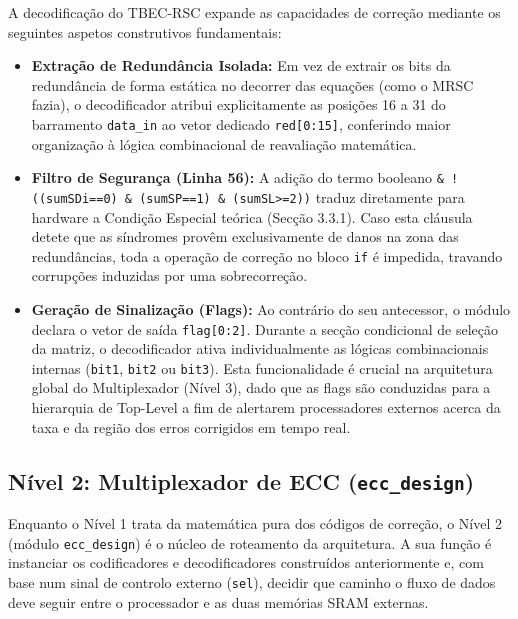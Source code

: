 \documentclass[12pt,a4paper]{article}
\begin{document}
A decodificação do TBEC-RSC expande as capacidades de correção mediante os seguintes aspetos construtivos fundamentais:
\begin{itemize}
    \item \textbf{Extração de Redundância Isolada:} Em vez de extrair os bits da redundância de forma estática no decorrer das equações (como o MRSC fazia), o decodificador atribui explicitamente as posições 16 a 31 do barramento \texttt{data\_in} ao vetor dedicado \texttt{red[0:15]}, conferindo maior organização à lógica combinacional de reavaliação matemática.
    \item \textbf{Filtro de Segurança (Linha 56):} A adição do termo booleano \texttt{\& !((sumSDi==0) \& (sumSP==1) \& (sumSL>=2))} traduz diretamente para hardware a Condição Especial teórica (Secção 3.3.1). Caso esta cláusula detete que as síndromes provêm exclusivamente de danos na zona das redundâncias, toda a operação de correção no bloco \texttt{if} é impedida, travando corrupções induzidas por uma sobrecorreção.
    \item \textbf{Geração de Sinalização (Flags):} Ao contrário do seu antecessor, o módulo declara o vetor de saída \texttt{flag[0:2]}. Durante a secção condicional de seleção da matriz, o decodificador ativa individualmente as lógicas combinacionais internas (\texttt{bit1}, \texttt{bit2} ou \texttt{bit3}). Esta funcionalidade é crucial na arquitetura global do Multiplexador (Nível 3), dado que as flags são conduzidas para a hierarquia de Top-Level a fim de alertarem processadores externos acerca da taxa e da região dos erros corrigidos em tempo real.
\end{itemize}

\subsection{Nível 2: Multiplexador de ECC (\texttt{ecc\_design})}
\label{sec:nivel2_multiplexador}

Enquanto o Nível 1 trata da matemática pura dos códigos de correção, o Nível 2 (módulo \texttt{ecc\_design}) é o núcleo de roteamento da arquitetura. A sua função é instanciar os codificadores e decodificadores construídos anteriormente e, com base num sinal de controlo externo (\texttt{sel}), decidir que caminho o fluxo de dados deve seguir entre o processador e as duas memórias SRAM externas.
\end{document}
